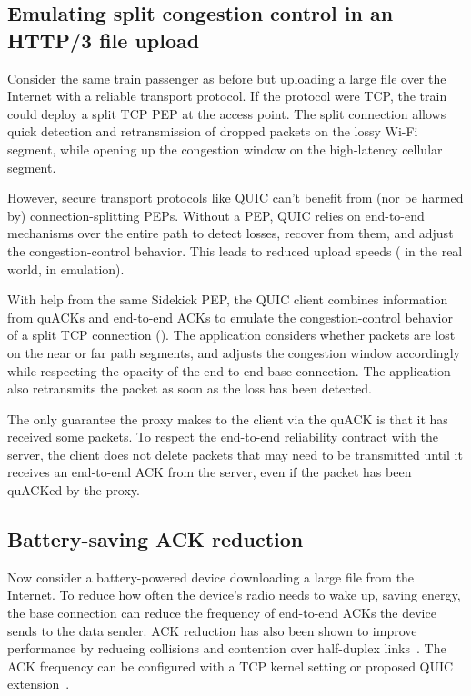 \subsection{Emulating split congestion control in an HTTP/3 file upload}
\label{sec:sidekick:motivating:http}

Consider the same train passenger as before but uploading a large file over the
Internet with a reliable transport protocol. If the protocol were TCP, the
train could deploy a split TCP PEP at the access point. The split connection
allows quick detection and retransmission of dropped packets on the lossy Wi-Fi
segment, while opening up the congestion window on the high-latency cellular
segment.

However, secure transport protocols like QUIC can't benefit from (nor be harmed
by) connection-splitting PEPs. Without a PEP, QUIC relies on end-to-end
mechanisms over the entire path to detect losses, recover from them, and adjust
the congestion-control behavior. This leads to reduced upload speeds
( in the real world,
 in emulation).

With help from the same Sidekick PEP, the QUIC client combines information from
quACKs and end-to-end ACKs to emulate the congestion-control behavior of a
split TCP connection (). The
application considers whether packets are lost on the near or far path
segments, and adjusts the congestion window accordingly while respecting the
opacity of the end-to-end base connection. The application also retransmits the
packet as soon as the loss has been detected.

The only guarantee the proxy makes to the client via the quACK is that it has
received some packets. To respect the end-to-end reliability contract with the
server, the client does not delete packets that may need to be transmitted
until it receives an end-to-end ACK from the server, even if the packet has
been quACKed by the proxy.

\subsection{Battery-saving ACK reduction}
\label{sec:sidekick:motivating:ack-reduction}

Now consider a battery-powered device downloading a large file from the
Internet. To reduce how often the device's
radio needs to wake up, saving energy, the base connection can reduce the
frequency of end-to-end ACKs the device sends to the data sender.
ACK reduction has also been shown to improve performance by reducing collisions
and contention over half-duplex links~\cite{custura2023reducing,li2020tack}.
The ACK frequency can be configured with a TCP kernel setting or proposed
QUIC extension~\cite{ietf-quic-ack-frequency-07}.

